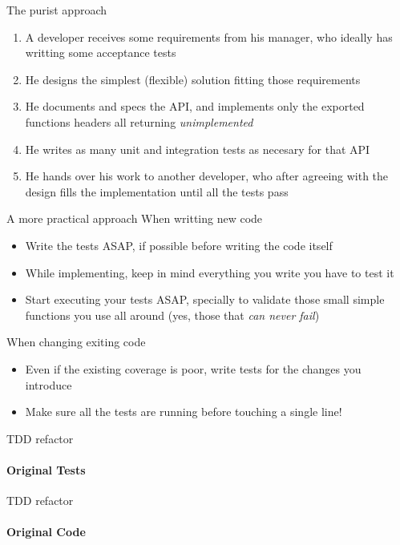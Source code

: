 \documentclass[]{beamer}
\begin{document}
\begin{frame}{The purist approach}
    \begin{enumerate}
    \item A developer receives some requirements from his manager, who ideally has writting some acceptance tests
    \pause
    \item He designs the simplest (flexible) solution fitting those requirements
    \pause
    \item He documents and specs the API, and implements only the exported functions headers all returning \emph{unimplemented}
    \pause
    \item He writes as many unit and integration tests as necesary for that API
    \pause
    \item He hands over his work to another developer, who after agreeing with the design fills the implementation until
    all the tests pass
    \end{enumerate}
\end{frame}

\begin{frame}{A more practical approach}
    When writting new code
    \begin{itemize}
    \item Write the tests ASAP, if possible before writing the code itself
    \pause
    \item While implementing, keep in mind everything you write you have to test it
    \pause
    \item Start executing your tests ASAP, specially to validate those small simple functions you use all around (yes,
    those that \emph{can never fail})
    \end{itemize}
    \pause
    When changing exiting code
    \begin{itemize}
    \item Even if the existing coverage is poor, write tests for the changes you introduce
    \pause
    \item Make sure all the tests are running before touching a single line!
    \end{itemize}
\end{frame}

\begin{frame}{TDD refactor}
    \framesubtitle{Original Tests}
    
\end{frame}

\begin{frame}{TDD refactor}
    \framesubtitle{Original Code}
    
\end{frame}
\end{document}
